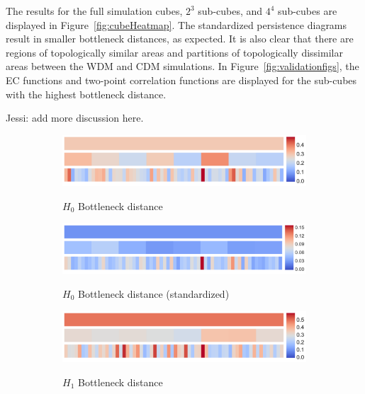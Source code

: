 \documentclass[12pt]{article}
\newcommand{\figref}[1]{Figure~\ref{#1}}
\begin{document}
The results for the full simulation cubes, $2^3$ sub-cubes, and $4^4$ sub-cubes are displayed in \figref{fig:cubeHeatmap}.  The standardized persistence diagrams result in smaller bottleneck distances, as expected.  
%
It is also clear that there are regions of topologically similar areas and partitions of topologically dissimilar areas between the WDM and CDM simulations.
In \figref{fig:validationfigs}, the EC functions and two-point correlation functions are displayed for the sub-cubes with the highest bottleneck distance.


{\color{blue}  Jessi:  add more discussion here.}


\begin{figure}[htp!]
  \centering
  \begin{subfigure}{.48\textwidth}
    \centering
    \caption{$H_0$ Bottleneck distance}
    \includegraphics[width=\linewidth]{fig_12_hmap_dim0_nonorm.pdf}
    \label{fig:cubeHeatmap0}
  \end{subfigure}
  \begin{subfigure}{.48\textwidth}
    \centering
    \caption{$H_0$ Bottleneck distance (standardized)}
    \includegraphics[width=\linewidth]{fig_12_hmap_dim0_yesnorm.pdf}
    \label{fig:cubeHeatmapStand0}
  \end{subfigure}
  \begin{subfigure}{.48\textwidth}
    \centering
    \caption{$H_1$ Bottleneck distance}
    \includegraphics[width=\linewidth]{fig_12_hmap_dim1_nonorm.pdf}
    \label{fig:cubeHeatmap1}
  \end{subfigure}
  \begin{subfigure}{.48\textwidth}

\end{subfigure}
\end{figure}
\end{document}
